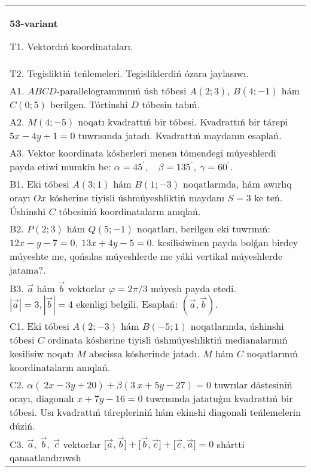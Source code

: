 \documentclass{article}
\begin{document}
    
    \begin{tabular}{m{17cm}}
    \textbf{53-variant}
    \newline
    
    T1. 
    Vektordıń koordinataları.
     \\
    T2. 
    Tegisliktiń teńlemeleri. Tegisliklerdiń ózara jaylasıwı.
     \\
    A1. 
    $ABCD$-parallelogrammınıń úsh tóbesi
    $A(2;3)$, $B(4;-1)$ hám $C(0;5)$ berilgen. Tórtinshi $D$
    tóbesin tabıń.
     \\
    A2. 
    $M(4;-5)$ noqatı kvadrattıń bir tóbesi. 
    Kvadrattıń bir tárepi $5x-4y+1=0$ tuwrısında jatadı. 
    Kvadrattıń maydanın esaplań.
     \\
    A3. 
    Vektor koordinata kósherleri menen tómendegi múyeshlerdi payda etiwi mumkin be:
    $\alpha = 45^{{^\circ}},\ \ \ \ \beta = 135^{{^\circ}},\ \gamma = 60^{{^\circ}}$.
     \\
    B1. 
    Eki tóbesi \(A(3;1)\) hám \(B(1;-3)\) noqatlarında, hám
    awırlıq orayı $Ox$ kósherine tiyisli úshmúyeshliktiń maydanı
    \(S=3\) ke teń. Úshinshi $C$ tóbesiniń koordinataların anıqlań. \\
    B2. 
    \(P(2;3)\) hám \(Q(5;-1)\) noqatları, berilgen eki
    tuwrınıń: $12x-y-7=0,\ 13x+4y-5=0$.
    kesilisiwinen payda bolǵan birdey múyeshte me, qońsılas múyeshlerde me yáki vertikal
    múyeshlerde jatama?.
     \\
    B3. 
    $\vec{a}$ hám $\vec{b}$ vektorlar $\varphi = 2\pi/3$ múyesh payda etedi. $|\vec{a}| = 3,|\vec{b}| = 4$ ekenligi belgili. Esaplań: 
    $\left(\vec{a},\vec{b} \right)$.
     \\
    C1. 
    Eki tóbesi \(A(2; - 3)\) hám \(B( - 5;1)\) noqatlarında,
    úshinshi tóbesi $C$ ordinata kósherine tiyisli úshmúyeshliktiń
    medianalarınıń kesilisiw noqatı $M$ abscissa kósherinde jatadı.
    $M$ hám $C$ noqatlarınıń koordinataların anıqlań.
     \\
    C2. 
    \(\alpha (\ 2x - 3y + 20) + \beta(3\ x + 5y - 27) = 0\) tuwrılar
    dástesiniń orayı, diagonalı \(x + 7y - 16 = 0\) tuwrısında jatatuǵın
    kvadrattıń bir tóbesi. Usı kvadrattıń tárepleriniń hám ekinshi diagonali
    teńlemelerin dúziń.
     \\
    C3. 
    \(\vec{a},\ \vec{b},\ \vec{c}\) vektorlar \(\lbrack\vec{a},\vec{b}\rbrack + \lbrack\vec{b},\vec{c}\rbrack + \lbrack\vec{c},\vec{a}\rbrack = 0\) shártti qanaatlandırıwsh
     \\
    
    \end{tabular}
    \vspace{1cm}
    
\end{document}
